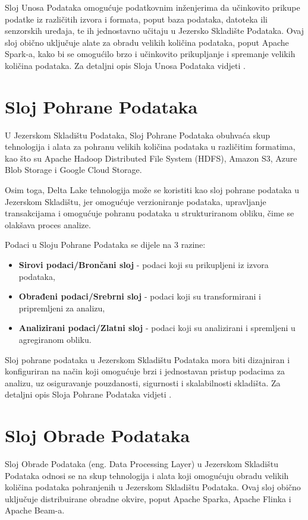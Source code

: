 Sloj Unosa Podataka omogućuje podatkovnim inženjerima da učinkovito prikupe
podatke iz različitih izvora i formata, poput baza podataka, datoteka ili
senzorskih uređaja, te ih jednostavno učitaju u Jezersko Skladište Podataka.
Ovaj sloj obično uključuje alate za obradu velikih količina podataka, poput
Apache Spark-a, kako bi se omogućilo brzo i učinkovito prikupljanje i spremanje
velikih količina podataka. Za detaljni opis Sloja Unosa Podataka vidjeti
\cite{datalakehouse2022}.

\section{Sloj Pohrane Podataka} \label{section:sloj_pohrane_podataka}

U Jezerskom Skladištu Podataka, Sloj Pohrane Podataka obuhvaća skup tehnologija
i alata za pohranu velikih količina podataka u različitim formatima, kao što su
Apache Hadoop Distributed File System (HDFS), Amazon S3, Azure Blob Storage i
Google Cloud Storage.

Osim toga, Delta Lake tehnologija može se koristiti kao sloj pohrane podataka u
Jezerskom Skladištu, jer omogućuje verzioniranje podataka, upravljanje
transakcijama i omogućuje pohranu podataka u strukturiranom obliku, čime se
olakšava proces analize.

Podaci u Sloju Pohrane Podataka se dijele na 3 razine:
\begin{itemize}
    \item \textbf{Sirovi podaci/Brončani sloj} - podaci koji su prikupljeni iz izvora podataka,
    \item \textbf{Obrađeni podaci/Srebrni sloj} - podaci koji su transformirani i pripremljeni za analizu,
    \item \textbf{Analizirani podaci/Zlatni sloj} - podaci koji su analizirani i spremljeni u agregiranom obliku.
\end{itemize}

Sloj pohrane podataka u Jezerskom Skladištu Podataka mora biti dizajniran i
konfiguriran na način koji omogućuje brzi i jednostavan pristup podacima za
analizu, uz osiguravanje pouzdanosti, sigurnosti i skalabilnosti skladišta. Za
detaljni opis Sloja Pohrane Podataka vidjeti \cite{datalakehouse2022}.

\section{Sloj Obrade Podataka} \label{section:sloj_obrade_podataka} Sloj Obrade
Podataka (eng. Data Processing Layer) u Jezerskom Skladištu Podataka odnosi se
na skup tehnologija i alata koji omogućuju obradu velikih količina podataka
pohranjenih u Jezerskom Skladištu Podataka. Ovaj sloj obično uključuje
distribuirane obradne okvire, poput Apache Sparka, Apache Flinka i Apache
Beam-a.

